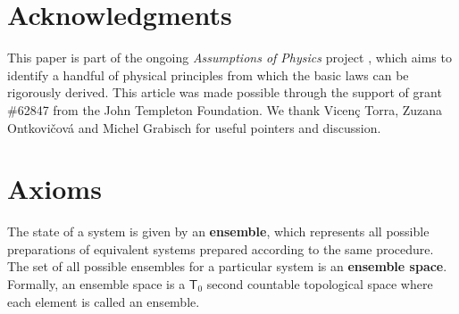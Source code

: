 \documentclass[10pt,twocolumn, nofootinbib]{revtex4-2}
\begin{document}
\section*{Acknowledgments}
This paper is part of the ongoing \textit{Assumptions of Physics} project \cite{aop-book}, which aims to identify a handful of physical principles from which the basic laws can be rigorously derived. This article was made possible through the support of grant \#62847 from the John Templeton Foundation. We thank Vicen\c{c} Torra, Zuzana Ontkovi\v{c}ov\'{a} and Michel Grabisch for useful pointers and discussion.




\newcommand{\pj}[1] {\underbar{$#1$}}

\appendix
\section*{Axioms}
\begin{axiom} 
	The state of a system is given by an \textbf{ensemble}, which represents all possible preparations of equivalent systems prepared according to the same procedure. The set of all possible ensembles for a particular system is an \textbf{ensemble space}. Formally, an ensemble space is a $\mathsf{T}_0$ second countable topological space where each element is called an ensemble.
\end{axiom}
\end{document}

